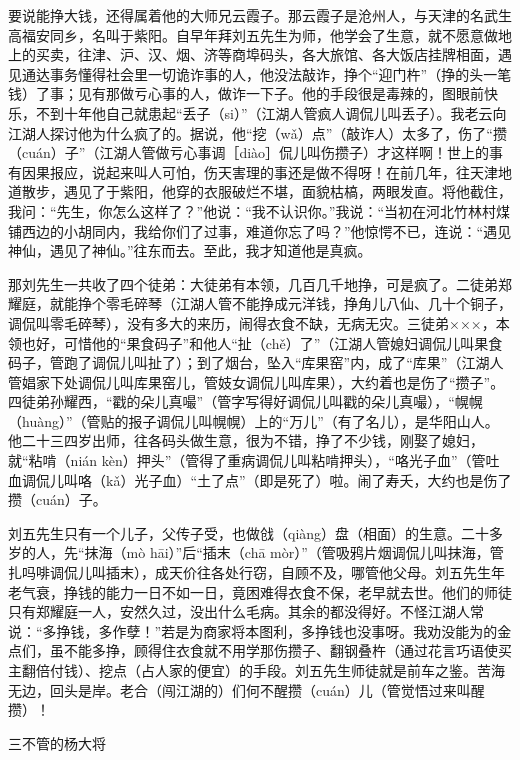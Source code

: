 \documentclass[12pt,UTF8]{ctexbook}
\begin{document}
要说能挣大钱，还得属着他的大师兄云霞子。那云霞子是沧州人，与天津的名武生高福安同乡，名叫于紫阳。自早年拜刘五先生为师，他学会了生意，就不愿意做地上的买卖，往津、沪、汉、烟、济等商埠码头，各大旅馆、各大饭店挂牌相面，遇见通达事务懂得社会里一切诡诈事的人，他没法敲诈，挣个“迎门杵”（挣的头一笔钱）了事；见有那做亏心事的人，做诈一下子。他的手段很是毒辣的，图眼前快乐，不到十年他自己就患起“丢子（si）”（江湖人管疯人调侃儿叫丢子）。我老云向江湖人探讨他为什么疯了的。据说，他“挖（wǎ）点”（敲诈人）太多了，伤了“攒（cuán）子”（江湖人管做亏心事调［diào］侃儿叫伤攒子）才这样啊！世上的事有因果报应，说起来叫人可怕，伤天害理的事还是做不得呀！在前几年，往天津地道散步，遇见了于紫阳，他穿的衣服破烂不堪，面貌枯槁，两眼发直。将他截住，我问：“先生，你怎么这样了？”他说：“我不认识你。”我说：“当初在河北竹林村煤铺西边的小胡同内，我给你们了过事，难道你忘了吗？”他惊愕不已，连说：“遇见神仙，遇见了神仙。”往东而去。至此，我才知道他是真疯。

那刘先生一共收了四个徒弟：大徒弟有本领，几百几千地挣，可是疯了。二徒弟郑耀庭，就能挣个零毛碎琴（江湖人管不能挣成元洋钱，挣角儿八仙、几十个铜子，调侃叫零毛碎琴），没有多大的来历，闹得衣食不缺，无病无灾。三徒弟×××，本领也好，可惜他的“果食码子”和他人“扯（chě）了”（江湖人管媳妇调侃儿叫果食码子，管跑了调侃儿叫扯了）；到了烟台，坠入“库果窑”内，成了“库果”（江湖人管娼家下处调侃儿叫库果窑儿，管妓女调侃儿叫库果），大约着也是伤了“攒子”。四徒弟孙耀西，“戳的朵儿真嘬”（管字写得好调侃儿叫戳的朵儿真嘬），“幌幌（huàng）”（管贴的报子调侃儿叫幌幌）上的“万儿”（有了名儿），是华阳山人。他二十三四岁出师，往各码头做生意，很为不错，挣了不少钱，刚娶了媳妇，就“粘啃（nián kèn）押头”（管得了重病调侃儿叫粘啃押头），“咯光子血”（管吐血调侃儿叫咯（kǎ）光子血）“土了点”（即是死了）啦。闹了寿夭，大约也是伤了攒（cuán）子。

刘五先生只有一个儿子，父传子受，也做戗（qiàng）盘（相面）的生意。二十多岁的人，先“抹海（mò hāi）”后“插末（chā mòr）”（管吸鸦片烟调侃儿叫抹海，管扎吗啡调侃儿叫插末），成天价往各处行窃，自顾不及，哪管他父母。刘五先生年老气衰，挣钱的能力一日不如一日，竟困难得衣食不保，老早就去世。他们的师徒只有郑耀庭一人，安然久过，没出什么毛病。其余的都没得好。不怪江湖人常说：“多挣钱，多作孽！”若是为商家将本图利，多挣钱也没事呀。我劝没能为的金点们，虽不能多挣，顾得住衣食就不用学那伤攒子、翻钢叠杵（通过花言巧语使买主翻倍付钱）、挖点（占人家的便宜）的手段。刘五先生师徒就是前车之鉴。苦海无边，回头是岸。老合（闯江湖的）们何不醒攒（cuán）儿（管觉悟过来叫醒攒）！





三不管的杨大将
\end{document}
